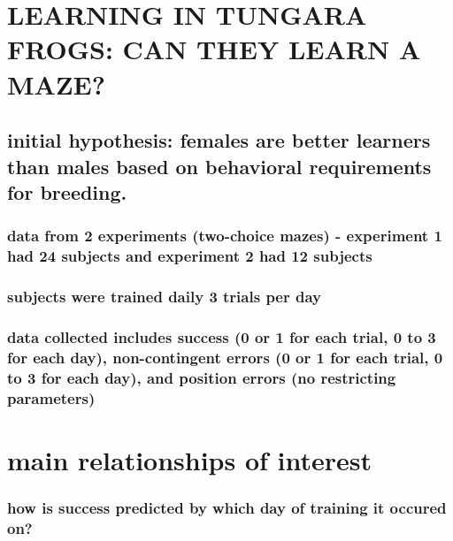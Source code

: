 \documentclass[]{article}
\title{}
\author{}
\date{}
\begin{document}
\section{LEARNING IN TUNGARA FROGS: CAN THEY LEARN A
MAZE?}\label{learning-in-tungara-frogs-can-they-learn-a-maze}

\subsection{initial hypothesis: females are better learners than males
based on behavioral requirements for
breeding.}\label{initial-hypothesis-females-are-better-learners-than-males-based-on-behavioral-requirements-for-breeding.}

\subsubsection{data from 2 experiments (two-choice mazes) - experiment 1
had 24 subjects and experiment 2 had 12
subjects}\label{data-from-2-experiments-two-choice-mazes---experiment-1-had-24-subjects-and-experiment-2-had-12-subjects}

\subsubsection{subjects were trained daily 3 trials per
day}\label{subjects-were-trained-daily-3-trials-per-day}

\subsubsection{data collected includes success (0 or 1 for each trial, 0
to 3 for each day), non-contingent errors (0 or 1 for each trial, 0 to 3
for each day), and position errors (no restricting
parameters)}\label{data-collected-includes-success-0-or-1-for-each-trial-0-to-3-for-each-day-non-contingent-errors-0-or-1-for-each-trial-0-to-3-for-each-day-and-position-errors-no-restricting-parameters}

\section{main relationships of
interest}\label{main-relationships-of-interest}

\subsubsection{how is success predicted by which day of training it
occured
on?}\label{how-is-success-predicted-by-which-day-of-training-it-occured-on}
\end{document}
